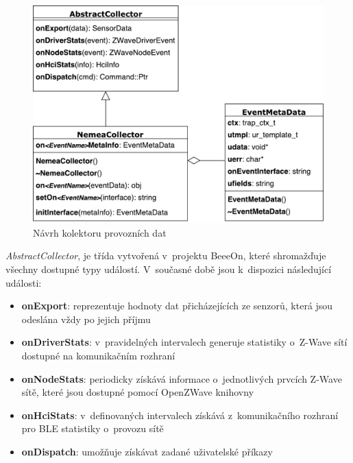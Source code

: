  \begin{figure}[ht]
   \begin{center}
   \includegraphics[scale=0.5]{pictures/modelTrid}
   \caption{Návrh kolektoru provozních dat}
   \label{obr.modelTrid}
   \end{center}
   \end{figure}
 
 \textit{AbstractCollector}, je třída vytvořená v~projektu BeeeOn, které shromažďuje všechny dostupné
 typy událostí.
 V~současné době jsou k~dispozici následující události:
 \begin{itemize}
  \item \textbf{onExport}:
   reprezentuje hodnoty dat přicházejících ze senzorů, která jsou odeslána vždy po jejich příjmu
   
  \item \textbf{onDriverStats}:
   v~pravidelných intervalech generuje statistiky o~Z-Wave sítí dostupné na komunikačním 
   rozhraní
   
  \item \textbf{onNodeStats}:
   periodicky získává informace o~jednotlivých prvcích Z-Wave sítě, které jsou dostupné pomocí
   OpenZWave knihovny
   
  \item \textbf{onHciStats}:
   v~definovaných intervalech získává z~komunikačního rozhraní pro BLE statistiky o~provozu
   sítě
  
  \item \textbf{onDispatch}:
  umožňuje získávat zadané uživatelské příkazy
 \end{itemize}

